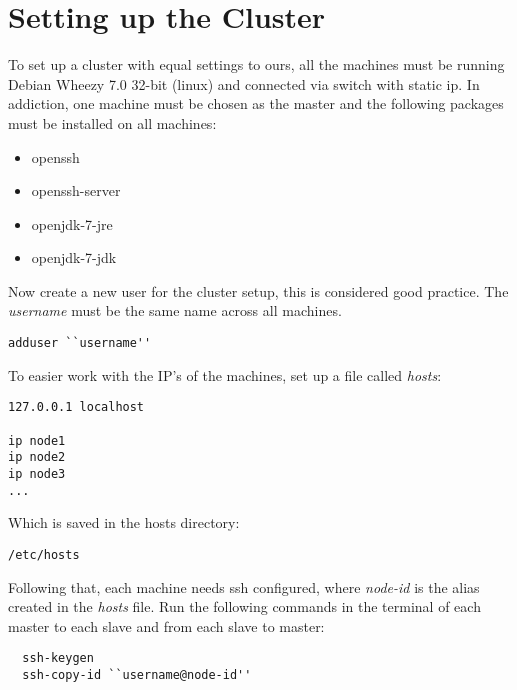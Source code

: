 \section{Setting up the Cluster}
\label{sec:hadoop}
To set up a cluster with equal settings to ours, all the machines must be running Debian Wheezy 7.0 32-bit (linux) and connected via switch with static ip. In addiction, one machine must be chosen as the master and the following packages must be installed on all machines:
\begin{itemize}
\item openssh 
\item openssh-server 
\item openjdk-7-jre 
\item openjdk-7-jdk 
\end{itemize}
Now create a new user for the cluster setup, this is considered good practice. The \emph{username} must be the same name across all machines.
\lstset{language=bash}

\begin{verbatim}
adduser ``username''
\end{verbatim}
To easier work with the IP's of the machines, set up a file called \emph{hosts}:
\begin{verbatim}
127.0.0.1 localhost

ip node1
ip node2
ip node3
...
\end{verbatim}
Which is saved in the hosts directory: 
\begin{verbatim}
/etc/hosts
\end{verbatim}
Following that, each machine needs ssh configured, where \emph{node-id} is the alias created in the \emph{hosts} file. Run the following commands in the terminal of each master to each slave and from each slave to master:
\begin{verbatim}
  ssh-keygen
  ssh-copy-id ``username@node-id''
\end{verbatim}

